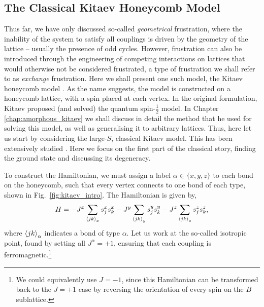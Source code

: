 \subsection{The Classical Kitaev Honeycomb Model}\label{sec:classical_kitaev}

Thus far, we have only discussed so-called \textit{geometrical} frustration, where the inability of the system to satisfy all couplings is driven by the geometry of the lattice -- usually the presence of odd cycles. However, frustration can also be introduced through the engineering of competing interactions on lattices that would otherwise not be considered frustrated, a type of frustration we shall refer to as \textit{exchange} frustration. Here we shall present one such model, the Kitaev honeycomb model \cite{kitaev_anyons_2006}. As the name suggests, the model is constructed on a honeycomb lattice, with a spin placed at each vertex. In the original formulation, Kitaev proposed (and solved) the quantum spin-$\frac 12$ model. In Chapter \ref{chap:amorphous_kitaev} we shall discuss in detail the method that he used for solving this model, as well as generalising it to arbitrary lattices. Thus, here let us start by considering the large-$S$, classical Kitaev model. This has been extensively studied \cite{baskaran_spin_2008,samarkoon_comprehensive_2017,rousochatzakis_quantum_2018,ma_z2_2023}.  Here we focus on the first part of the classical story, finding the ground state and discussing its degeneracy. 

To construct the Hamiltonian, we must assign a label $\alpha \in \{x,y,z\}$ to each bond on the honeycomb, such that every vertex connects to one bond of each type, shown in Fig.~\ref{fig:kitaev_intro}. The Hamiltonian is given by,
\begin{align} \label{eqn:classical_kitaev_hamiltonian}
    H =  
    - J^x \sum_{\braket{jk}_x} s_j^x s_k^x
    - J^y \sum_{\braket{jk}_y} s_j^y s_k^y
    - J^z \sum_{\braket{jk}_z} s_j^z s_k^z,
\end{align}
where $\braket{jk}_\alpha$ indicates a bond of type $\alpha$. Let us work at the so-called isotropic point, found by setting all $J^\alpha = +1$, ensuring that each coupling is ferromagnetic.\footnote{We could equivalently use $J = -1$, since this Hamiltonian can be transformed back to the $J=+1$ case by reversing the orientation of every spin on the $B$ sublattice.}

